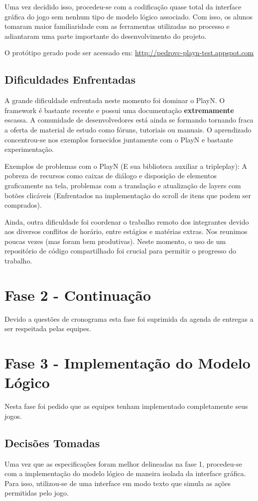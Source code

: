 \documentclass[brazil,times]{abnt}
\begin{document}
Uma vez decidido isso, procedeu-se com a codificação quase total da interface
gráfica do jogo sem nenhum tipo de modelo lógico associado. Com isso, os alunos
tomaram maior familiaridade com as ferramentas utilizadas no processo e
adiantaram uma parte importante do desenvolvimento do projeto.

O protótipo gerado pode ser acessado em:
\url{http://pedrovc-playn-test.appspot.com}

\subsection{Dificuldades Enfrentadas}
A grande dificuldade enfrentada neste momento foi dominar o PlayN. O framework é
bastante recente e possui uma documentação \textbf{extremamente} escassa. A
comunidade de desenvolvedores está ainda se formando tornando fraca a oferta de
material de estudo como fóruns, tutoriais ou manuais. O
aprendizado concentrou-se nos exemplos fornecidos juntamente com o PlayN e
bastante experimentação.

Exemplos de problemas com o PlayN (E sua biblioteca auxiliar a tripleplay): A
pobreza de recursos como caixas de diálogo e disposição de elementos
graficamente na tela, problemas com a translação e atualização de layers com
botões clicáveis (Enfrentados na implementação do scroll de itens que podem ser
comprados).

Ainda, outra dificuldade foi coordenar o trabalho remoto dos integrantes devido
aos diversos conflitos de horário, entre estágios e matérias extras. Nos
reunimos poucas vezes (mas foram bem produtivas). Neste momento, o uso de um
repositório de código compartilhado foi crucial para permitir o progresso do
trabalho.


\section{Fase 2 - Continuação}
Devido a questões de cronograma esta fase foi suprimida da agenda de entregas a
ser respeitada pelas equipes.


\section{Fase 3 - Implementação do Modelo Lógico}
Nesta fase foi pedido que as equipes tenham implementado completamente seus
jogos.

\subsection{Decisões Tomadas}
Uma vez que as especificações foram melhor delineadas na fase 1, procedeu-se com
a implementação do modelo lógico de maneira isolada da interface gráfica. Para
isso, utilizou-se de uma interface em modo texto que simula as ações permitidas
pelo jogo.
\end{document}
